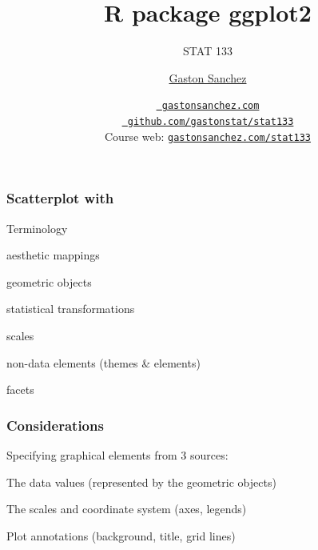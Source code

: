 \documentclass[12pt]{beamer}\usepackage[]{graphicx}\usepackage[]{color}
\title{R package ggplot2}
\subtitle{STAT 133}
\author{\href{http://www.gastonsanchez.com}{Gaston Sanchez}}
\institute{Department of Statistics, UC{\textendash}Berkeley}
\date{\href{http://www.gastonsanchez.com}{\tt \scriptsize \color{foreground} gastonsanchez.com}
\\[-4pt]
\href{http://github.com/gastonstat/stat133}{\tt \scriptsize \color{foreground} github.com/gastonstat/stat133}
\\[-4pt]
{\scriptsize Course web: \href{http://www.gastonsanchez.com/stat133}{\tt gastonsanchez.com/stat133}}
}
\begin{document}
{
  \frame{
    \titlepage
  } 
}


\begin{frame}
\begin{center}
\Huge{}
\end{center}
\end{frame}




\begin{frame}[fragile]
\frametitle{Scatterplot with }

Terminology
\bi
  \item aesthetic mappings
  \item geometric objects
  \item statistical transformations
  \item scales
  \item non-data elements (themes \& elements)
  \item facets
\ei

\end{frame}


\begin{frame}[fragile]
\frametitle{Considerations}

Specifying graphical elements from 3 sources:
\bbi
  \item The data values (represented by the geometric objects)
  \item The scales and coordinate system (axes, legends)
  \item Plot annotations (background, title, grid lines)
\ei

\end{frame}

\end{document}
